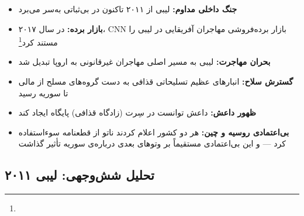 \begin{tcolorbox}[enemybox, title={فاجعه: پیامدهای مداخله در لیبی}]
\begin{itemize}
\item \textbf{جنگ داخلی مداوم:} لیبی از ۲۰۱۱ تاکنون در بی‌ثباتی به‌سر می‌برد
\item \textbf{بازار برده:} در سال ۲۰۱۷، CNN بازار برده‌فروشی مهاجران آفریقایی در لیبی را مستند کرد\footnote{}
\item \textbf{بحران مهاجرت:} لیبی به مسیر اصلی مهاجران غیرقانونی به اروپا تبدیل شد
\item \textbf{گسترش سلاح:} انبارهای عظیم تسلیحاتی قذافی به دست گروه‌های مسلح از مالی تا سوریه رسید
\item \textbf{ظهور داعش:} داعش توانست در سِرت (زادگاه قذافی) پایگاه ایجاد کند
\item \textbf{بی‌اعتمادی روسیه و چین:} هر دو کشور اعلام کردند ناتو از قطعنامه سوءاستفاده کرد — و این بی‌اعتمادی مستقیماً بر وتوهای بعدی درباره‌ی سوریه تأثیر گذاشت
\end{itemize}
\end{tcolorbox}

\subsection{تحلیل شش‌وجهی: لیبی ۲۰۱۱}
\label{subsec:ch10-libya-hexagonal}

